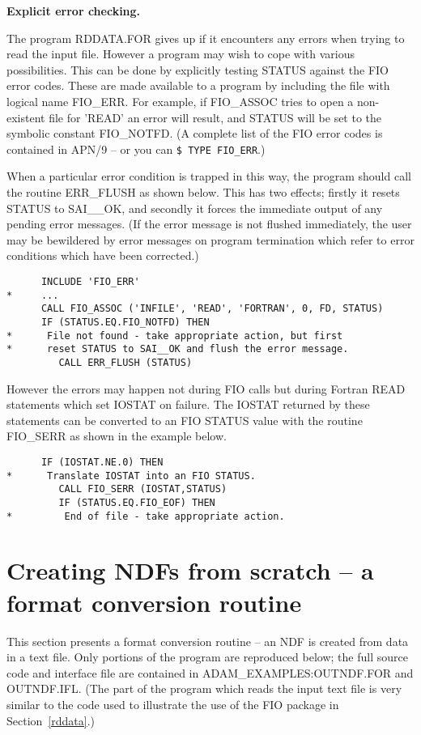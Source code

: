 {\bigskip\large\bf Explicit error checking.}

The program RDDATA.FOR gives up if it encounters any errors when trying to
read the input file.
However a program may wish to cope with various possibilities.
This can be done by explicitly testing STATUS against the FIO error codes.
These are made available to a program by including the file with 
logical name FIO\_ERR.
For example, if FIO\_ASSOC tries to open a non-existent file for 'READ'
an error will result, and STATUS will be set to the symbolic constant 
FIO\_NOTFD.
(A complete list of the FIO error codes is contained in APN/9
-- or you can {\tt \$ TYPE FIO\_ERR}.)

When a particular error condition is trapped in this way, the program 
should call the routine ERR\_FLUSH as shown below. This has two effects; 
firstly it resets STATUS
to SAI\_\_OK, and secondly it forces the immediate output of any pending 
error messages. (If the error message is not flushed immediately, the user 
may be bewildered by error messages on program termination which refer to
error conditions which have been corrected.)
\begin{verbatim}
      INCLUDE 'FIO_ERR'
*     ...
      CALL FIO_ASSOC ('INFILE', 'READ', 'FORTRAN', 0, FD, STATUS)
      IF (STATUS.EQ.FIO_NOTFD) THEN
*      File not found - take appropriate action, but first
*      reset STATUS to SAI__OK and flush the error message.
         CALL ERR_FLUSH (STATUS)
\end{verbatim}
However the errors may happen not during FIO calls 
but during Fortran READ statements which set 
IOSTAT on failure.
The IOSTAT returned by these statements can be converted to an FIO STATUS 
value with the routine FIO\_SERR as shown in the example below.
\begin{verbatim}
      IF (IOSTAT.NE.0) THEN
*      Translate IOSTAT into an FIO STATUS.
         CALL FIO_SERR (IOSTAT,STATUS)
         IF (STATUS.EQ.FIO_EOF) THEN
*         End of file - take appropriate action.
\end{verbatim}

\newpage
\section{Creating NDFs from scratch -- a format conversion routine\label{outndf}}

This section presents a format conversion routine --
an NDF is created from data in a text file.
Only portions of the program are reproduced below; 
the full source code and interface file are contained in 
ADAM\_EXAMPLES:OUTNDF.FOR and OUTNDF.IFL.
(The part of the program which reads the input text file is very similar
to the code used to illustrate the use of the FIO package 
in Section~\ref{rddata}.)


